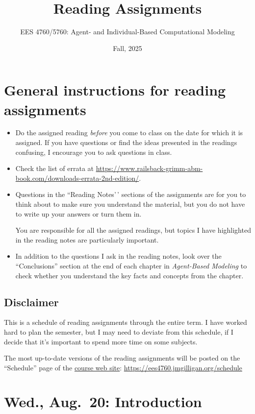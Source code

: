 \documentclass[
]{article}
\title{Reading Assignments}
\author{EES 4760/5760: Agent- and Individual-Based Computational
Modeling}
\date{Fall, 2025}
\begin{document}
\maketitle

\section{General instructions for reading
assignments}\label{general-instructions-for-reading-assignments}

\begin{itemize}
\item
  Do the assigned reading \emph{before\/} you come to class on the date
  for which it is assigned. If you have questions or find the ideas
  presented in the readings confusing, I encourage you to ask questions
  in class.
\item
  Check the list of errata at
  \url{https://www.railsback-grimm-abm-book.com/downloads-errata-2nd-edition/}.
\item
  Questions in the ``Reading Notes'\,' sections of the assignments are
  for you to think about to make sure you understand the material, but
  you do not have to write up your answers or turn them in.

  You are responsible for all the assigned readings, but topics I have
  highlighted in the reading notes are particularly important.
\item
  In addition to the questions I ask in the reading notes, look over the
  ``Conclusions'' section at the end of each chapter in
  \emph{Agent-Based Modeling} to check whether you understand the key
  facts and concepts from the chapter.
\end{itemize}

\subsection{Disclaimer}\label{disclaimer}

This is a schedule of reading assignments through the entire term. I
have worked hard to plan the semester, but I may need to deviate from
this schedule, if I decide that it's important to spend more time on
some subjects.

The most up-to-date versions of the reading assignments will be posted
on the ``Schedule'' page of the
\href{https://ees4760.jmgilligan.org/schedule}{course web site}:
\url{https://ees4760.jmgilligan.org/schedule}

\section{Wed., Aug.~20: Introduction}\label{wed.-aug.-20-introduction}
\end{document}
